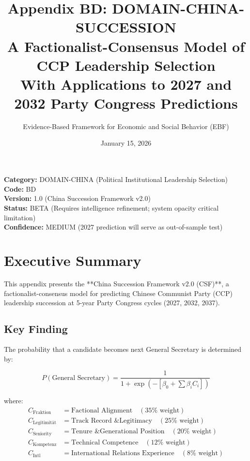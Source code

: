 \documentclass[11pt]{article}
\title{\textbf{Appendix BD: DOMAIN-CHINA-SUCCESSION} \\ A Factionalist-Consensus Model of CCP Leadership Selection \\ With Applications to 2027 and 2032 Party Congress Predictions}
\author{Evidence-Based Framework for Economic and Social Behavior (EBF)}
\date{January 15, 2026}
\begin{document}
\maketitle

\begin{center}
\colorbox{lightgreen!30}{\begin{minipage}{0.95\textwidth}
\textbf{Category:} DOMAIN-CHINA (Political Institutional Leadership Selection) \\
\textbf{Code:} BD \\
\textbf{Version:} 1.0 (China Succession Framework v2.0) \\
\textbf{Status:} BETA (Requires intelligence refinement; system opacity critical limitation) \\
\textbf{Confidence:} MEDIUM (2027 prediction will serve as out-of-sample test)
\end{minipage}}
\end{center}

\section{Executive Summary}

This appendix presents the **China Succession Framework v2.0 (CSF)**, a factionalist-consensus model for predicting Chinese Communist Party (CCP) leadership succession at 5-year Party Congress cycles (2027, 2032, 2037).

\subsection{Key Finding}

The probability that a candidate becomes next General Secretary is determined by:

\begin{equation}
P(\text{General Secretary}) = \frac{1}{1 + \exp(-[\beta_0 + \sum \beta_i C_i])}
\end{equation}

where:
\begin{align*}
C_{\text{Fraktion}} &= \text{Factional Alignment} \quad (35\% \text{ weight}) \\
C_{\text{Legitimität}} &= \text{Track Record \& Legitimacy} \quad (25\% \text{ weight}) \\
C_{\text{Seniority}} &= \text{Tenure \& Generational Position} \quad (20\% \text{ weight}) \\
C_{\text{Kompetenz}} &= \text{Technical Competence} \quad (12\% \text{ weight}) \\
C_{\text{Intl}} &= \text{International Relations Experience} \quad (8\% \text{ weight})
\end{align*}
\end{document}
